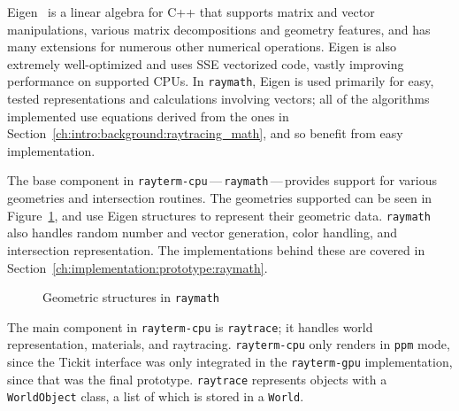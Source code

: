 Eigen~\cite{eigenweb} is a linear algebra for C++ that supports matrix and vector manipulations, various matrix decompositions and geometry features, and has many extensions for numerous other numerical operations.
Eigen is also extremely well-optimized and uses SSE vectorized code, vastly improving performance on supported CPUs.
In \texttt{raymath}, Eigen is used primarily for easy, tested representations and calculations involving vectors; all of the algorithms implemented use equations derived from the ones in Section~\ref{ch:intro:background:raytracing_math}, and so benefit from easy implementation.

The base component in \texttt{rayterm-cpu}\,---\,\texttt{raymath}\,---\,provides support for various geometries and intersection routines.
The geometries supported can be seen in Figure~\ref{fig:rayterm-cpu_raymath_geometry}, and use Eigen structures to represent their geometric data.
\texttt{raymath} also handles random number and vector generation, color handling, and intersection representation.
The implementations behind these are covered in Section~\ref{ch:implementation:prototype:raymath}.

\vspace{0.3em}
\begin{figure}[htb]
  \centering
  \caption{Geometric structures in \texttt{raymath}}
\label{fig:rayterm-cpu_raymath_geometry}
\end{figure}

The main component in \texttt{rayterm-cpu} is \texttt{raytrace}; it handles world representation, materials, and raytracing.
\texttt{rayterm-cpu} only renders in \texttt{ppm} mode, since the Tickit interface was only integrated in the \texttt{rayterm-gpu} implementation, since that was the final prototype.
\texttt{raytrace} represents objects with a \texttt{WorldObject} class, a list of which is stored in a \texttt{World}.


